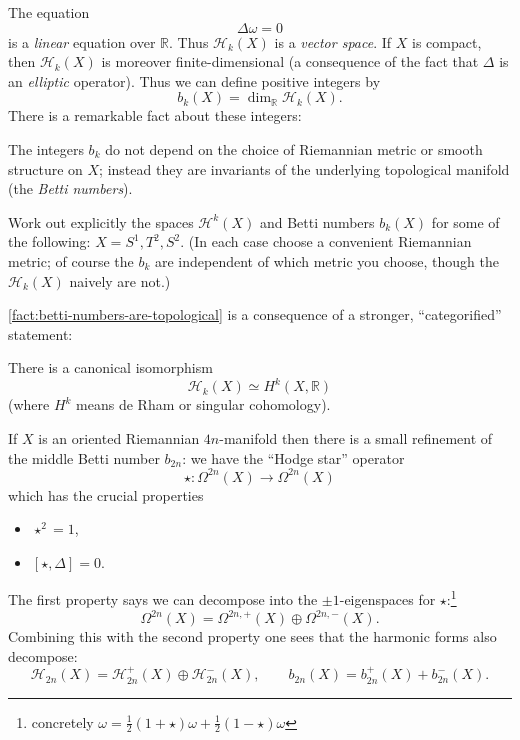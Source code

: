 \documentclass[12pt,letterpaper,reqno]{article}
\numberwithin{equation}{section}
\newcommand{\cH}{\ensuremath{\mathcal H}}
\newcommand{\R}{\ensuremath{\mathbb R}}
\newcommand{\half}{\ensuremath{\frac{1}{2}}}
\newcommand{\ti}[1]{\textit{#1}}
\begin{document}
The equation
\begin{equation} \label{eq:laplace}
\Delta \omega = 0
\end{equation}
is a \ti{linear} equation over $\R$.
Thus $\cH_k(X)$ is a \ti{vector space}.
If $X$ is compact, then $\cH_k(X)$ is moreover finite-dimensional (a consequence of
the fact that $\Delta$ is an \ti{elliptic} operator). Thus we can define
positive integers by
\begin{equation}
  b_k(X) = \dim_\R \cH_k(X).
\end{equation}
There is a remarkable fact about these integers:
\begin{fact} \label{fact:betti-numbers-are-topological} The integers $b_k$ do not depend on the choice of Riemannian metric or smooth
structure on $X$; instead they are invariants of the underlying topological manifold
(the \ti{Betti numbers}).
\end{fact}

\begin{exercise} Work out explicitly the spaces $\cH^k(X)$ and
Betti numbers $b_k(X)$ for some of the following: $X = S^1, T^2, S^2$.
(In each case choose a convenient Riemannian metric; of course the $b_k$
are independent of which metric you choose, though the $\cH_k(X)$
naively are not.)
\end{exercise}

\autoref{fact:betti-numbers-are-topological}
is a consequence of a stronger, ``categorified'' statement:
\begin{fact} There is a canonical isomorphism
\begin{equation}
  \cH_k(X) \simeq H^k(X,\R)
\end{equation}
(where $H^k$ means de Rham or singular cohomology).
\end{fact}

If $X$ is an oriented Riemannian $4n$-manifold then there is a small refinement of the
middle Betti number $b_{2n}$:
we have the ``Hodge star'' operator
\begin{equation}
  \star: \Omega^{2n}(X) \to \Omega^{2n}(X)
\end{equation}
which has the crucial properties
\begin{itemize}
  \item $\star^2 = 1$,
  \item $[\star, \Delta] = 0$.
\end{itemize}
The first property says we can decompose into the $\pm 1$-eigenspaces
for $\star$:\footnote{concretely $\omega = \half(1 + \star) \omega + \half(1 - \star) \omega $}
\begin{equation}
  \Omega^{2n}(X) = \Omega^{2n,+}(X) \oplus \Omega^{2n,-}(X).
\end{equation}
Combining this with the second property one sees that the harmonic forms also decompose:
\begin{equation}
  \cH_{2n}(X) = \cH_{2n}^+(X) \oplus \cH_{2n}^-(X), \qquad b_{2n}(X) = b_{2n}^+(X) + b_{2n}^-(X).
\end{equation}
\end{document}
